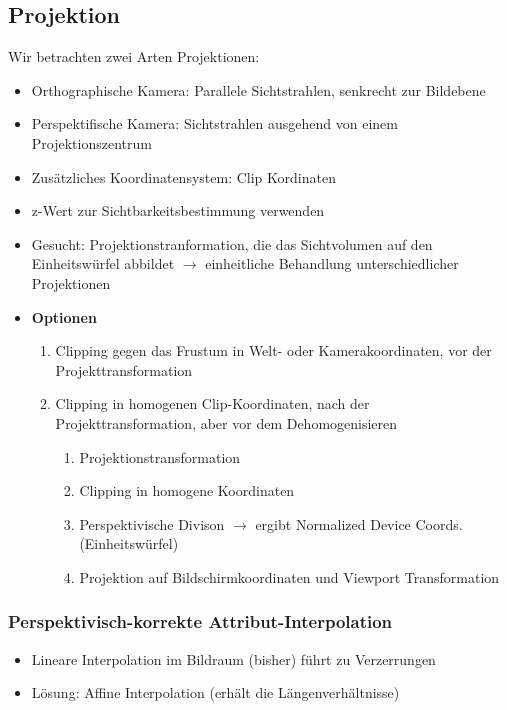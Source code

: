 \subsection{Projektion}
Wir betrachten zwei Arten Projektionen:
\begin{itemize}
	\item Orthographische Kamera: Parallele Sichtstrahlen, senkrecht zur Bildebene
	\item Perspektifische Kamera: Sichtstrahlen ausgehend von einem Projektionszentrum
	\item Zusätzliches Koordinatensystem: Clip Kordinaten
	\item z-Wert zur Sichtbarkeitsbestimmung verwenden
	\item Gesucht: Projektionstranformation, die das Sichtvolumen auf den Einheitswürfel abbildet \(\rightarrow\) einheitliche Behandlung unterschiedlicher Projektionen
	\item \textbf{Optionen}
	\begin{enumerate}
		\item Clipping gegen das Frustum in Welt- oder Kamerakoordinaten, vor der Projekttransformation
		\item Clipping in homogenen Clip-Koordinaten, nach der Projekttransformation, aber vor dem Dehomogenisieren
		\begin{enumerate}
			\item Projektionstransformation
			\item Clipping in homogene Koordinaten
			\item Perspektivische Divison \(\rightarrow\) ergibt Normalized Device Coords. (Einheitswürfel)
			\item Projektion auf Bildschirmkoordinaten und Viewport Transformation
		\end{enumerate}
	\end{enumerate}
\end{itemize}

\subsubsection{Perspektivisch-korrekte Attribut-Interpolation}
\begin{itemize}
	\item Lineare Interpolation im Bildraum (bisher) führt zu Verzerrungen
	\item Lösung: Affine Interpolation (erhält die Längenverhältnisse)
\end{itemize}


